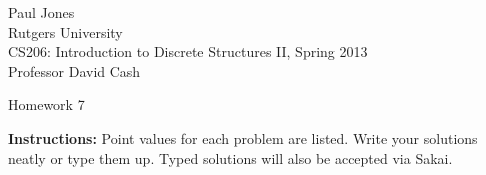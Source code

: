 \documentclass[11pt]{article}
\begin{document}
\sloppy

\noindent Paul Jones \\
Rutgers University\\
CS206: Introduction to Discrete Structures II, Spring 2013\\
Professor David Cash\\

\begin{center}
Homework 7
\end{center}

\vspace{.1in}

\noindent\textbf{Instructions:} Point values for each problem are listed.
Write your solutions neatly or type them up.  Typed solutions will also be
accepted via Sakai.
\end{document}
